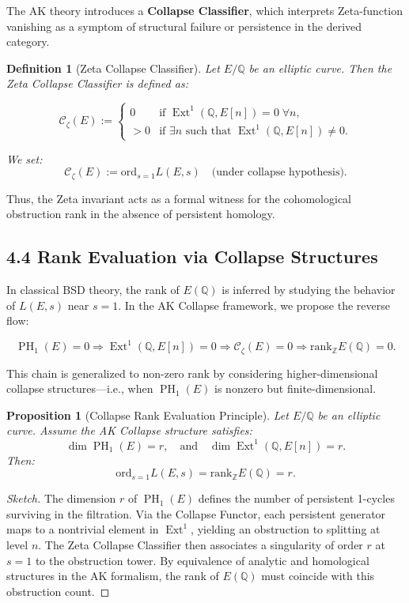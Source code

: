 \documentclass[11pt]{article}
\newtheorem{definition}[theorem]{Definition}
\newtheorem{proposition}[theorem]{Proposition}
\DeclareMathOperator{\Ext}{Ext}
\DeclareMathOperator{\PH}{PH}
\newcommand{\QQ}{\mathbb{Q}}
\newcommand{\ZZ}{\mathbb{Z}}
\begin{document}
The AK theory introduces a \textbf{Collapse Classifier}, which interprets Zeta-function vanishing as a symptom of structural failure or persistence in the derived category.

\begin{definition}[Zeta Collapse Classifier]
Let $E/\QQ$ be an elliptic curve.  
Then the \emph{Zeta Collapse Classifier} is defined as:

\[
\mathcal{C}_{\zeta}(E) := 
\begin{cases}
0 & \text{if } \Ext^1(\QQ,E[n]) = 0 \; \forall n, \\
>0 & \text{if } \exists n \text{ such that } \Ext^1(\QQ,E[n]) \neq 0.
\end{cases}
\]

We set:
\[
\mathcal{C}_{\zeta}(E) := \mathrm{ord}_{s=1} L(E,s)
\quad \text{(under collapse hypothesis).}
\]
\end{definition}

Thus, the Zeta invariant acts as a formal witness for the cohomological obstruction rank in the absence of persistent homology.

\subsection{4.4 Rank Evaluation via Collapse Structures}

In classical BSD theory, the rank of $E(\QQ)$ is inferred by studying the behavior of $L(E,s)$ near $s=1$.  
In the AK Collapse framework, we propose the reverse flow:

\[
\PH_1(E) = 0 \Rightarrow \Ext^1(\QQ,E[n]) = 0 \Rightarrow \mathcal{C}_{\zeta}(E) = 0 \Rightarrow \mathrm{rank}_{\ZZ} E(\QQ) = 0.
\]

This chain is generalized to non-zero rank by considering higher-dimensional collapse structures—i.e., when $\PH_1(E)$ is nonzero but finite-dimensional.

\begin{proposition}[Collapse Rank Evaluation Principle]
\label{prop:zeta-collapse-rank}
Let $E/\QQ$ be an elliptic curve.  
Assume the AK Collapse structure satisfies:
\[
\dim \PH_1(E) = r,
\quad \text{and} \quad \dim \Ext^1(\QQ,E[n]) = r.
\]
Then:
\[
\mathrm{ord}_{s=1} L(E,s) = \mathrm{rank}_{\ZZ} E(\QQ) = r.
\]
\end{proposition}

\begin{proof}[Sketch]
The dimension $r$ of $\PH_1(E)$ defines the number of persistent 1-cycles surviving in the filtration.  
Via the Collapse Functor, each persistent generator maps to a nontrivial element in $\Ext^1$, yielding an obstruction to splitting at level $n$.  
The Zeta Collapse Classifier then associates a singularity of order $r$ at $s=1$ to the obstruction tower.  
By equivalence of analytic and homological structures in the AK formalism, the rank of $E(\QQ)$ must coincide with this obstruction count.
\end{proof}
\end{document}
